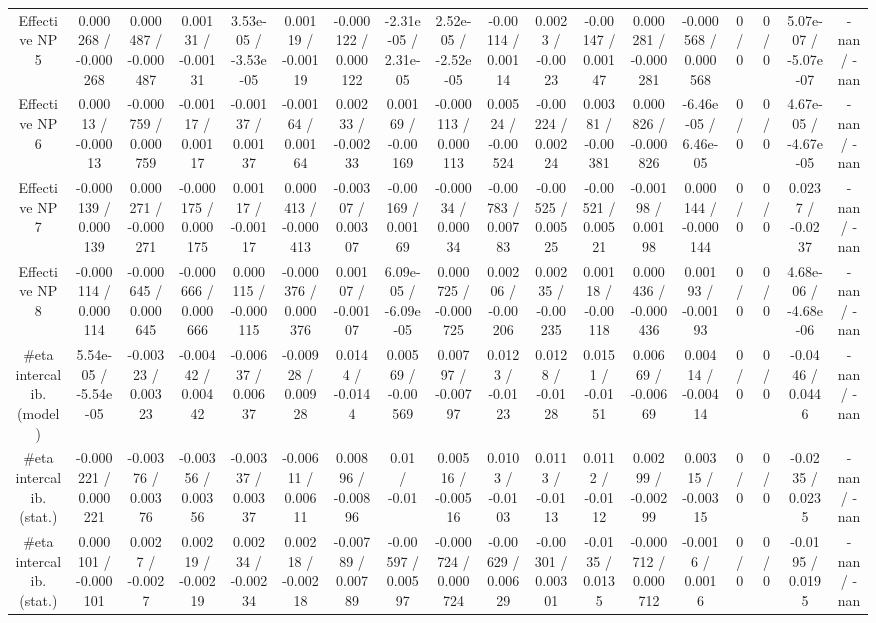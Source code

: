 \documentclass[10pt]{article}
\begin{document}
\begin{table}[htbp]
\begin{center}
\begin{tabular}{|c|c|c|c|c|c|c|c|c|c|c|c|c|c|c|c|c|c|}
  Effective NP 5 & 0.000268 / -0.000268 & 0.000487 / -0.000487 & 0.00131 / -0.00131 & 3.53e-05 / -3.53e-05 & 0.00119 / -0.00119 & -0.000122 / 0.000122 & -2.31e-05 / 2.31e-05 & 2.52e-05 / -2.52e-05 & -0.00114 / 0.00114 & 0.0023 / -0.0023 & -0.00147 / 0.00147 & 0.000281 / -0.000281 & -0.000568 / 0.000568 & 0 / 0 & 0 / 0 & 5.07e-07 / -5.07e-07 & -nan / -nan \\ 
  Effective NP 6 & 0.00013 / -0.00013 & -0.000759 / 0.000759 & -0.00117 / 0.00117 & -0.00137 / 0.00137 & -0.00164 / 0.00164 & 0.00233 / -0.00233 & 0.00169 / -0.00169 & -0.000113 / 0.000113 & 0.00524 / -0.00524 & -0.00224 / 0.00224 & 0.00381 / -0.00381 & 0.000826 / -0.000826 & -6.46e-05 / 6.46e-05 & 0 / 0 & 0 / 0 & 4.67e-05 / -4.67e-05 & -nan / -nan \\ 
  Effective NP 7 & -0.000139 / 0.000139 & 0.000271 / -0.000271 & -0.000175 / 0.000175 & 0.00117 / -0.00117 & 0.000413 / -0.000413 & -0.00307 / 0.00307 & -0.00169 / 0.00169 & -0.00034 / 0.00034 & -0.00783 / 0.00783 & -0.00525 / 0.00525 & -0.00521 / 0.00521 & -0.00198 / 0.00198 & 0.000144 / -0.000144 & 0 / 0 & 0 / 0 & 0.0237 / -0.0237 & -nan / -nan \\ 
  Effective NP 8 & -0.000114 / 0.000114 & -0.000645 / 0.000645 & -0.000666 / 0.000666 & 0.000115 / -0.000115 & -0.000376 / 0.000376 & 0.00107 / -0.00107 & 6.09e-05 / -6.09e-05 & 0.000725 / -0.000725 & 0.00206 / -0.00206 & 0.00235 / -0.00235 & 0.00118 / -0.00118 & 0.000436 / -0.000436 & 0.00193 / -0.00193 & 0 / 0 & 0 / 0 & 4.68e-06 / -4.68e-06 & -nan / -nan \\ 
  #eta intercalib. (model) & 5.54e-05 / -5.54e-05 & -0.00323 / 0.00323 & -0.00442 / 0.00442 & -0.00637 / 0.00637 & -0.00928 / 0.00928 & 0.0144 / -0.0144 & 0.00569 / -0.00569 & 0.00797 / -0.00797 & 0.0123 / -0.0123 & 0.0128 / -0.0128 & 0.0151 / -0.0151 & 0.00669 / -0.00669 & 0.00414 / -0.00414 & 0 / 0 & 0 / 0 & -0.0446 / 0.0446 & -nan / -nan \\ 
  #eta intercalib. (stat.) & -0.000221 / 0.000221 & -0.00376 / 0.00376 & -0.00356 / 0.00356 & -0.00337 / 0.00337 & -0.00611 / 0.00611 & 0.00896 / -0.00896 & 0.01 / -0.01 & 0.00516 / -0.00516 & 0.0103 / -0.0103 & 0.0113 / -0.0113 & 0.0112 / -0.0112 & 0.00299 / -0.00299 & 0.00315 / -0.00315 & 0 / 0 & 0 / 0 & -0.0235 / 0.0235 & -nan / -nan \\ 
  #eta intercalib. (stat.) & 0.000101 / -0.000101 & 0.0027 / -0.0027 & 0.00219 / -0.00219 & 0.00234 / -0.00234 & 0.00218 / -0.00218 & -0.00789 / 0.00789 & -0.00597 / 0.00597 & -0.000724 / 0.000724 & -0.00629 / 0.00629 & -0.00301 / 0.00301 & -0.0135 / 0.0135 & -0.000712 / 0.000712 & -0.0016 / 0.0016 & 0 / 0 & 0 / 0 & -0.0195 / 0.0195 & -nan / -nan \\ 

\end{tabular}
\end{center}
\end{table}
\end{document}
